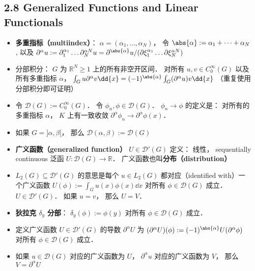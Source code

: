 \subsection{2.8 Generalized Functions and Linear Functionals}
\begin{itemize}
\item \textbf{多重指标（multiindex）}： $\alpha = (\alpha_1, \dots, \alpha_N)$， 令 $\abs{\alpha} := \alpha_1 + \dots + \alpha_N$, 以及 $\partial^\alpha u := \partial_1^{\alpha_1} \dots \partial_N^{\alpha N} u = \partial^{\abs{\alpha}} u/ (\partial\xi_1^{\alpha_1} \dots \partial\xi_N^{\alpha N})$

\item 分部积分： $G$ 为 $\mathbb R^N \ge 1$ 上的所有非空开区间． 对所有 $u, v \in C_0^\infty(G)$ 以及所有多重指标 $\alpha$， $\int_G u\partial^\alpha v \dd{x} = (-1)^{\abs{\alpha}} \int_G (\partial^\alpha u)v \dd{x}$ （重复使用分部积分即可证明）

\item 令 $\mathcal D(G) := C_0^\infty(G)$． 令 $\phi_n, \phi \in \mathcal D(G)$． $\phi_n \to \phi$ 的定义是： 对所有的多重指标 $\alpha$， $K$ 上有一致收敛 $\partial^\alpha \phi_n \to \partial^\alpha \phi(x)$．

\item 如果 $G = ]\alpha,\beta[$， 那么 $\mathcal D(\alpha,\beta) := \mathcal D(G)$

\item \textbf{广义函数（generalized function）} $U \in \mathcal D'(G)$ 定义： 线性， sequentially continuous 泛函 $U: \mathcal D(G) \to \mathbb R$． 广义函数也叫\textbf{分布（distribution）}

\item $L_2(G) \subseteq \mathcal D'(G)$ 的意思是每个 $u\in L_2(G)$ 都对应（identified with）一个广义函数 $U(\phi) := \int_G u(x) \phi(x) \dd{x}$ 对所有 $\phi \in \mathcal D(G)$ 成立． $U \in \mathcal D'(G)$． 如果 $u = v$， 那么 $U = V$．

\item \textbf{狄拉克 $\delta_y$ 分部}： $\delta_y(\phi) := \phi(y)$ 对所有 $\phi\in\mathcal D(G)$ 成立．

\item 定义广义函数 $U \in \mathcal D'(G)$ 的导数 $\partial^\alpha U$ 为 $(\partial^\alpha U)(\phi) := (-1)^{\abs{\alpha}} U(\partial^\alpha \phi)$ 对所有 $\phi\in\mathcal D(G)$ 成立．

\item 如果 $u \in\mathcal D(G)$ 对应的广义函数为 $U$， $\partial^\alpha u$ 对应的广义函数为 $V$， 那么 $V = \partial^\alpha U$


\end{itemize}
